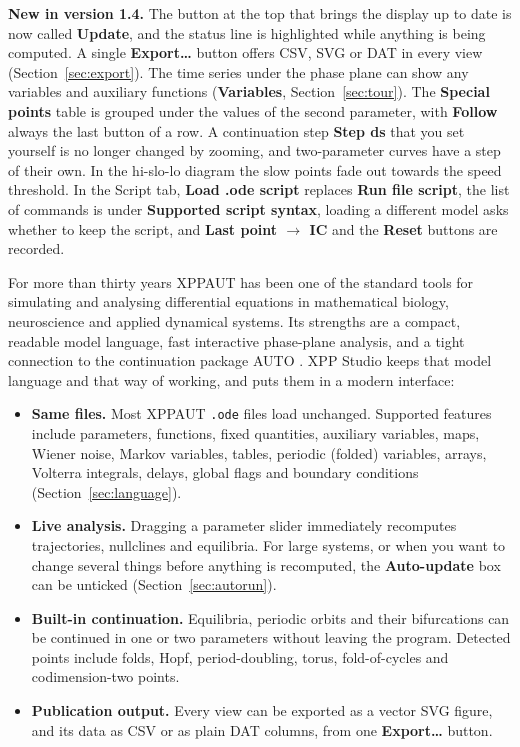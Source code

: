 \documentclass[11pt,a4paper]{article}
\newcommand{\XS}{\textsf{XPP Studio}}
\newcommand{\XPP}{\textsf{XPPAUT}}
\newcommand{\ui}[1]{\textsf{\textbf{#1}}}          %
\begin{document}
\begin{notebox}
\textbf{New in version 1.4.} The button at the top that brings the display up to date is now called \ui{Update}, and the status line is highlighted while anything is being computed. A single \ui{Export\ldots} button offers CSV, SVG or DAT in every view (Section~\ref{sec:export}). The time series under the phase plane can show any variables and auxiliary functions (\ui{Variables}, Section~\ref{sec:tour}). The \ui{Special points} table is grouped under the values of the second parameter, with \ui{Follow} always the last button of a row. A continuation step \ui{Step ds} that you set yourself is no longer changed by zooming, and two-parameter curves have a step of their own. In the hi-slo-lo diagram the slow points fade out towards the speed threshold. In the Script tab, \ui{Load .ode script} replaces \ui{Run file script}, the list of commands is under \ui{Supported script syntax}, loading a different model asks whether to keep the script, and \ui{Last point $\to$ IC} and the \ui{Reset} buttons are recorded.
\end{notebox}

For more than thirty years \XPP{} \cite{ermentrout2002} has been one of the standard tools for simulating and analysing differential equations in mathematical biology, neuroscience and applied dynamical systems. Its strengths are a compact, readable model language, fast interactive phase-plane analysis, and a tight connection to the continuation package \textsf{AUTO} \cite{doedel2007}. \XS{} keeps that model language and that way of working, and puts them in a modern interface:

\begin{itemize}
  \item \textbf{Same files.} Most \XPP{} \texttt{.ode} files load unchanged. Supported features include parameters, functions, fixed quantities, auxiliary variables, maps, Wiener noise, Markov variables, tables, periodic (folded) variables, arrays, Volterra integrals, delays, global flags and boundary conditions (Section~\ref{sec:language}).
  \item \textbf{Live analysis.} Dragging a parameter slider immediately recomputes trajectories, nullclines and equilibria. For large systems, or when you want to change several things before anything is recomputed, the \ui{Auto-update} box can be unticked (Section~\ref{sec:autorun}).
  \item \textbf{Built-in continuation.} Equilibria, periodic orbits and their bifurcations can be continued in one or two parameters without leaving the program. Detected points include folds, Hopf, period-doubling, torus, fold-of-cycles and codimension-two points.
  \item \textbf{Publication output.} Every view can be exported as a vector SVG figure, and its data as CSV or as plain DAT columns, from one \ui{Export\ldots} button.
\end{itemize}
\end{document}
